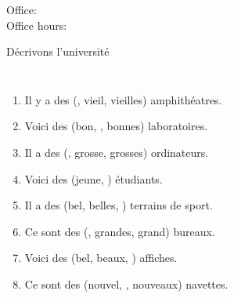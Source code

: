 \documentclass{beamer}
\subtitle[Adjectifs prénominaux au pluriel]{Les adjectifs prénominaux au pluriel}
\begin{document}
  \begin{frame}
    \titlepage
    \tiny{Office: \\
          Office hours: }
  \end{frame}

  \begin{frame}{Décrivons l'université}
    \begin{columns}
        {\scriptsize
        \begin{enumerate}
          \item Il y a des (, vieil, vieilles) amphithéatres.
          \item<3-> Voici des (bon, , bonnes) laboratoires.
          \item<5-> Il a des (, grosse, grosses) ordinateurs.
          \item<7-> Voici des (jeune, ) étudiants.
          \item<9-> Il a des (bel, belles, ) terrains de sport.
          \item<11-> Ce sont des (, grandes, grand) bureaux.
          \item<13-> Voici des (bel, beaux, ) affiches.
          \item<15-> Ce sont des (nouvel, , nouveaux) navettes.
        \end{enumerate}
        }
        \begin{minipage}[c][0.6\textheight]{\linewidth}
          \begin{center}
          \end{center}
        \end{minipage}
    \end{columns}
  \end{frame}
\end{document}
